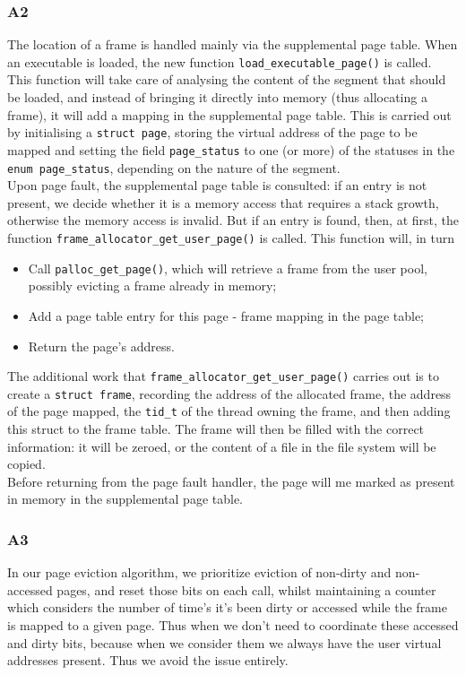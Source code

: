 \documentclass[a4wide, 11pt]{article}
\newcommand{\tx}{\texttt}
\begin{document}
\subsubsection{A2}
The location of a frame is handled mainly via the supplemental page table.
When an executable is loaded, the new function \tx{load\_executable\_page()} is called. This function will take care of analysing the content of the segment that should be loaded, and instead of bringing it directly into memory (thus allocating a frame), it will add a mapping in the supplemental page table. This is carried out by initialising a \tx{struct page}, storing the virtual address of the page to be mapped and setting the field \tx{page\_status} to one (or more) of the statuses in the \tx{enum page\_status}, depending on the nature of the segment. \\
Upon page fault, the supplemental page table is consulted: if an entry is not present, we decide whether it is a memory access that requires a stack growth, otherwise the memory access is invalid. But if an entry is found, then, at first, the function \tx{frame\_allocator\_get\_user\_page()} is called. This function will, in turn
\begin{itemize}
\item Call \tx{palloc\_get\_page()}, which will retrieve a frame from the user pool, possibly evicting a frame already in memory;
\item Add a page table entry for this page - frame mapping in the page table;
\item Return the page's address.
\end{itemize}
The additional work that \tx{frame\_allocator\_get\_user\_page()} carries out is to create a \tx{struct frame}, recording the address of the allocated frame, the address of the page  mapped, the \tx{tid\_t} of the thread owning the frame, and then adding this struct to the frame table. The frame will then be filled with the correct information: it will be zeroed, or the content of a file in the file system will be copied. \\
Before returning from the page fault handler, the page will me marked as present in memory in the supplemental page table.

\subsubsection{A3}
In our page eviction algorithm, we prioritize eviction of non-dirty and non-accessed pages, and reset those bits on each call, whilst maintaining a counter which considers the number of time's it's been dirty or accessed while the frame is mapped to a given page. Thus when we don't need to coordinate these accessed and dirty bits, because when we consider them we always have the user virtual addresses present. Thus we avoid the issue entirely.
\end{document}
